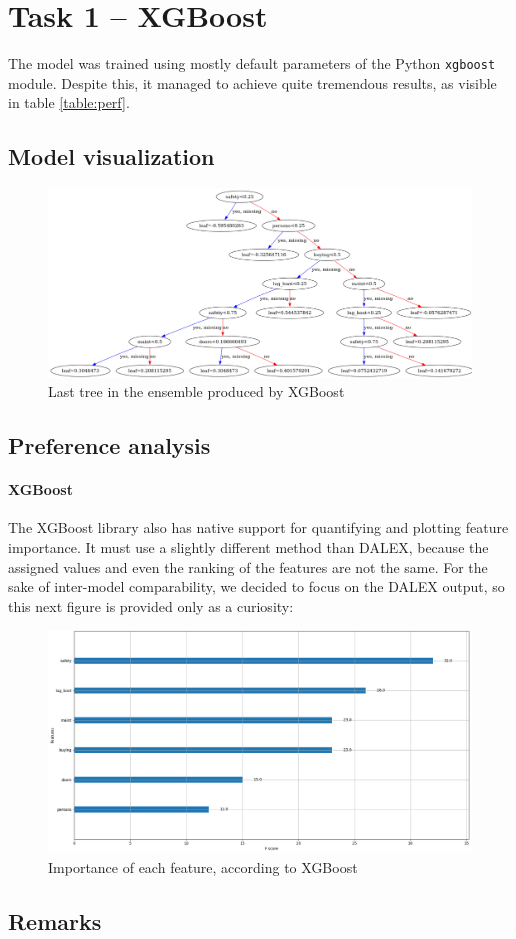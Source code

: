 \documentclass[../main.tex]{subfiles}
\begin{document}
\section{Task 1 -- XGBoost}
The model was trained using mostly default parameters of the Python
\verb`xgboost` module. Despite this, it managed to achieve quite tremendous
results, as visible in table \ref{table:perf}.

\subsection{Model visualization}
\begin{figure}[H]
	\centering
	\includegraphics[width=\linewidth]{../img/xgb-tree.png}
	\caption{Last tree in the ensemble produced by XGBoost}
	\label{fig:xgb-tree}
\end{figure}

\subsection{Preference analysis}

\paragraph{XGBoost}
The XGBoost library also has native support for quantifying and plotting
feature importance. It must use a slightly different method than DALEX, because
the assigned values and even the ranking of the features are not the same. For
the sake of inter-model comparability, we decided to focus on the DALEX output,
so this next figure is provided only as a curiosity:
\begin{figure}[H]
	\centering
	\includegraphics[width=\linewidth]{../img/xgb-feature-importance-xgboost.png}
	\caption{Importance of each feature, according to XGBoost}
	\label{fig:xgb-feats-xgboost}
\end{figure}

\subsection{Remarks}
\end{document}
